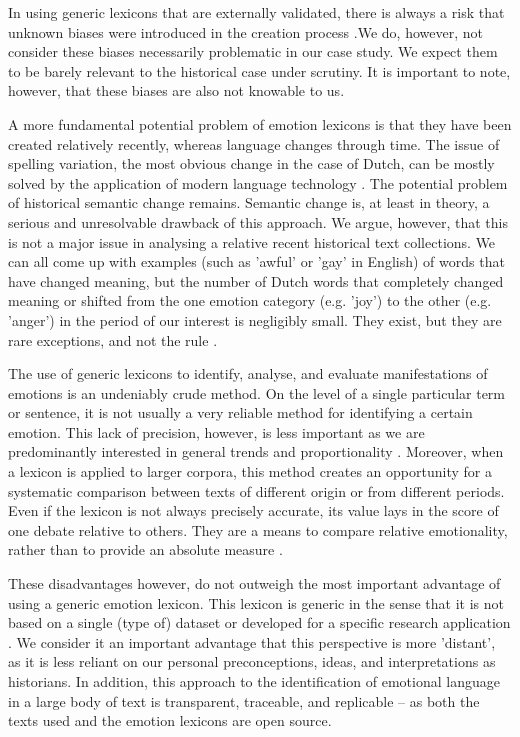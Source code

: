 \documentclass{dhbenelux}
\begin{document}
In using generic lexicons that are externally validated, there is always a risk that unknown biases were introduced in the creation process \citep{mohammad_practical_2020}.We do, however, not consider these biases necessarily problematic in our case study. We expect them to be barely relevant to the historical case under scrutiny. It is important to note, however, that these biases are also not knowable to us.

A more fundamental potential problem of emotion lexicons is that they have been created relatively recently, whereas language changes through time. The issue of spelling variation, the most obvious change in the case of Dutch, can be mostly solved by the application of modern language technology \citep{reynaert_piccl:_2015}. The potential problem of historical semantic change remains. Semantic change is, at least in theory, a serious and unresolvable drawback of this approach. We argue, however, that this is not a major issue in analysing a relative recent historical text collections. We can all come up with examples (such as 'awful' or 'gay' in English) of words that have changed meaning, but the number of Dutch words that completely changed meaning or shifted from the one emotion category (e.g. 'joy') to the other (e.g. 'anger') in the period of our interest is negligibly small. They exist, but they are rare exceptions, and not the rule \citep{hamilton_inducing_2016, boot_workshop_2018, morin_birth_2016}.

The use of generic lexicons to identify, analyse, and evaluate manifestations of emotions is an undeniably crude method. On the level of a single particular term or sentence, it is not usually a very reliable method for identifying a certain emotion. This lack of precision, however, is less important as we are predominantly interested in general trends and proportionality \citep{wiedemann_text_2016}. Moreover, when a lexicon is applied to larger corpora, this method creates an opportunity for a systematic comparison between texts of different origin or from different periods. Even if the lexicon is not always precisely accurate, its value lays in the score of one debate relative to others. They are a means to compare relative emotionality, rather than to provide an absolute measure \citep{drucker_distant_2014}. 

These disadvantages however, do not outweigh the most important advantage of using a generic emotion lexicon. This lexicon is generic in the sense that it is not based on a single (type of) dataset or developed for a specific research application \citep{mohammad_crowdsourcing_2013}. We consider it an important advantage that this perspective is more 'distant', as it is less reliant on our personal preconceptions, ideas, and interpretations as historians. In addition, this approach to the identification of emotional language in a large body of text is transparent, traceable, and replicable – as both the texts used and the emotion lexicons are open source.
\end{document}
